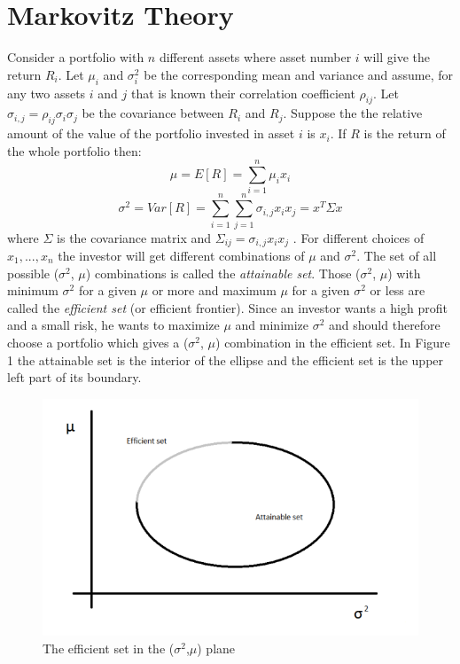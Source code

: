 \section{Markovitz Theory}
Consider a portfolio with $n$ different assets where asset number $i$ will give the return $R_i$. Let $\mu_i$ and $\sigma^2_i$ be the corresponding mean and variance and assume, for any two assets $i$ and $j$ that is known their correlation coefficient $\rho_{ij}$. Let $\sigma_{i,j} = \rho_{ij}\sigma_i\sigma_j$ be the covariance between $R_i$ and $R_j$. Suppose the the relative amount of the value of the portfolio invested in asset $i$ is $x_i$. If $R$ is the return of the whole portfolio then:
\begin{equation}
\mu = E[R] = \sum\limits_{i=1}^n\mu_i x_i 
\end{equation}
\begin{equation}
\sigma^2 = Var[R] = \sum\limits_{i=1}^n\sum\limits_{j=1}^n\sigma_{i,j}x_i x_j = x^T \Sigma x
\end{equation}
where $\Sigma$ is the covariance matrix and $\Sigma_{ij} = \sigma_{i,j}x_i x_j$ \cite{markovitz}.
For different choices of $x_1, ..., x_n$ the investor will get different combinations of $\mu$ and $\sigma^2$. The set of all possible ($\sigma^2$, $\mu$) combinations is called the \textit{attainable set}. Those ($\sigma^2$, $\mu$) with minimum $\sigma^2$ for a given $\mu$ or more and maximum $\mu$ for a given $\sigma^2$ or less are called the \textit{efficient set} (or efficient frontier). Since an investor wants a high profit and a small risk, he wants to maximize $\mu$ and minimize $\sigma^2$ and should therefore choose a portfolio which gives a ($\sigma^2$, $\mu$) combination in the efficient set. In Figure 1 the attainable set is the interior of the ellipse and the efficient set is the upper left part of its boundary. \\
\begin{figure}
\centering
\includegraphics[scale=0.5]{efficient_set} 
\caption{The efficient set in the ($\sigma^2$,$\mu$) plane}
\end{figure}

